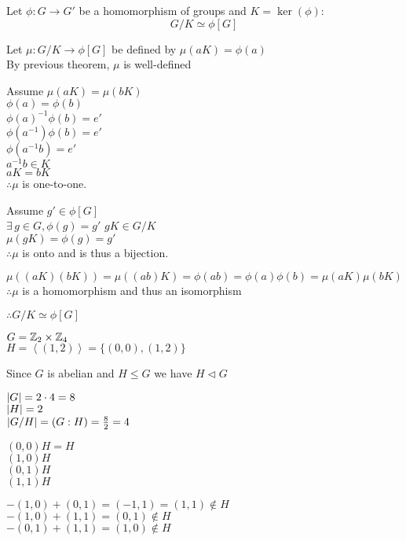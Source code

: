 \documentclass[letterpaper,12pt,fleqn]{article}
\newcommand{\cycle}[1]{\left<#1\right>}
\newcommand{\n}{\mathrel{\triangleleft}}
\newcommand{\p}{\phi}
\newcommand{\m}{\mu}
\begin{document}
\begin{theorem}
  Let $\p:G\to G'$ be a homomorphism of groups and $K=\ker(\p)$:
  \[G/K\simeq\p[G]\]
\end{theorem}

\begin{theproof}
  Let $\m:G/K\to\p[G]$ be defined by $\m(aK)=\p(a)$ \\
  By previous theorem, $\m$ is well-defined

  \begin{minipage}[t]{3in}
    Assume $\m(aK)=\m(bK)$ \\
    $\p(a)=\p(b)$ \\
    $\p(a)^{-1}\p(b)=e'$ \\
    $\p(a^{-1})\p(b)=e'$ \\
    $\p(a^{-1}b)=e'$ \\
    $a^{-1}b\in K$ \\
    $aK=bK$ \\
    $\therefore\m$ is one-to-one.
  \end{minipage}
  \begin{minipage}[t]{3in}
    Assume $g'\in\p[G]$ \\
    $\exists\,g\in G,\p(g)=g'$
    $gK\in G/K$ \\
    $\m(gK)=\p(g)=g'$ \\
    $\therefore\m$ is onto and is thus a bijection.
  \end{minipage}

  $\m((aK)(bK))=\m((ab)K)=\p(ab)=\p(a)\p(b)=\m(aK)\m(bK)$ \\
  $\therefore\m$ is a homomorphism and thus an isomorphism

  $\therefore G/K\simeq\p[G]$
\end{theproof}

\begin{example}
  $G=\mathbb{Z}_2\times\mathbb{Z}_4$ \\
  $H=\cycle{(1,2)}=\{(0,0),(1,2)\}$

  Since $G$ is abelian and $H\le G$ we have $H\n G$

  $\lvert G\rvert=2\cdot4=8$ \\
  $\lvert H\rvert=2$ \\
  $\lvert G/H\rvert=(G:H)=\frac{8}{2}=4$

  \begin{minipage}[t]{2in}
    $(0,0)H=H$ \\
    $(1,0)H$ \\
    $(0,1)H$ \\
    $(1,1)H$
  \end{minipage}
  \begin{minipage}[t]{3in}
    $-(1,0)+(0,1)=(-1,1)=(1,1)\notin H$ \\
    $-(1,0)+(1,1)=(0,1)\notin H$ \\
    $-(0,1)+(1,1)=(1,0)\notin H$
  \end{minipage}
\end{example}
\end{document}
